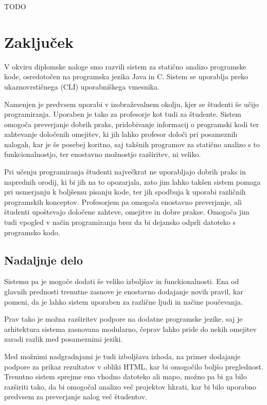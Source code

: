 \documentclass[a4paper,12pt,openright]{book}
\begin{document}
TODO

\chapter{Zaključek}
\label{latex}

V okviru diplomske naloge smo razvili sistem za statično analizo programske kode, osredotočen na programska jezika Java in C. Sistem se uporablja preko ukaznovrstičnega (CLI) uporabniškega vmesnika.

Namenjen je predvsem uporabi v izobraževalnem okolju, kjer se študenti še učijo programiranja. Uporaben je tako za profesorje kot tudi za študente. Sistem omogoča preverjanje dobrih praks, pridobivanje informacij o programski kodi ter zahtevanje določenih omejitev, ki jih lahko profesor določi pri posameznih nalogah, kar je še posebej koritno, saj takšnih programov za statično analizo s to funkcionalnostjo, ter enostavno možnostjo razširitev, ni veliko.

Pri učenju programiranja študenti največkrat ne uporabljajo dobrih praks in naprednih orodij, ki bi jih na to opozarjala, zato jim lahko takšen sistem pomaga pri usmerjanju k boljšemu pisanju kode, ter jih spodbuja k uporabi različnih programskih konceptov. Profesorjem pa omogoča enostavno preverjanje, ali študenti upoštevajo določene zahteve, omejitve in dobre prakse. Omogoča jim tudi vpogled v način programiranja brez da bi dejansko odprli datoteko s programsko kodo.

\section{Nadaljnje delo}

Sistemu pa je mogoče dodati še veliko izboljšav in funckionalnosti. Ena od glavnih prednosti trenutne zasnove je enostavno dodajanje novih pravil, kar pomeni, da je lahko sistem uporaben za različne ljudi in načine poučevanja.

Prav tako je možna razširitev podpore na dodatne programske jezike, saj je arhitektura sistema zasnovana modularno, čeprav lahko pride do nekih omejitev zaradi razlik med posameznimi jeziki.

Med možnimi nadgradnjami je tudi izboljšava izhoda, na primer dodajanje podpore za prikaz rezultatov v obliki HTML, kar bi omogočilo boljšo preglednost. Trenutno sistem sprejme eno vhodno datoteko ali mapo, možno pa bi ga bilo razširiti tako, da bi omogočal analizo več projektov hkrati, kar bi bilo uporabno predvsem za preverjanje nalog več študentov.
\end{document}
